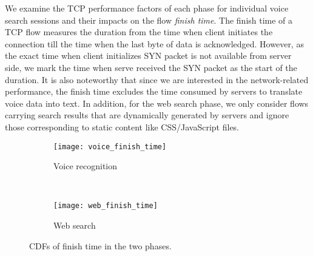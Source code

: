We examine the TCP performance factors of each phase for individual voice search sessions and their impacts on the flow \emph{finish time}. The finish time of a TCP flow measures the duration from the time when client initiates the connection till the time when the last byte of data is acknowledged. However, as the exact time when client initializes SYN packet is not available from server side, we mark the time when serve received the SYN packet as the start of the duration. It is also noteworthy that since we are interested in the network-related performance, the finish time excludes the time consumed by servers to translate voice data into text. In addition, for the web search phase, we only consider flows carrying search results that are dynamically generated by servers and ignore those corresponding to static content like CSS/JavaScript files.  


\begin{figure}[th]
\centering
\begin{subfigure}[b]{0.8\linewidth}
	\texttt{[image: voice\_finish\_time]}
\caption{Voice recognition}
\label{fig:voice_finish_time}
\end{subfigure} \\
\begin{subfigure}[b]{0.8\linewidth}
	\texttt{[image: web\_finish\_time]}
\caption{Web search}
\label{fig:web_finish_time}
\end{subfigure}
\caption{CDFs of finish time in the two phases.}
\label{fig:finish_time}
\end{figure}



